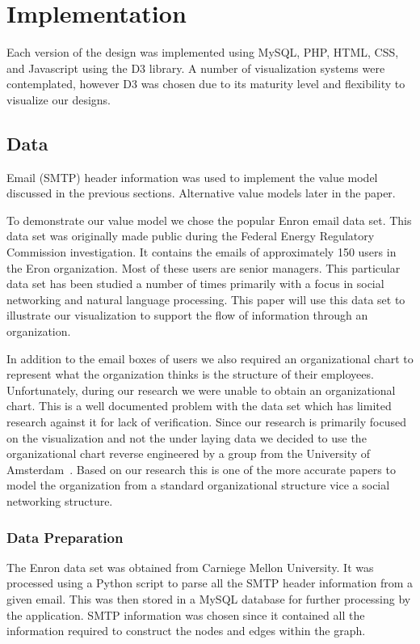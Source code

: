 \documentclass[journal]{vgtc}                %
\begin{document}
\section{Implementation}
\label{sec:implementation}
Each version of the design was implemented using MySQL, PHP, HTML, CSS, and Javascript using the D3 library.  A number of visualization systems were contemplated, however D3 was chosen due to its maturity level and flexibility to visualize our designs.

\subsection{Data}
Email (SMTP) header information was used to implement the value model discussed in the previous sections.  Alternative value models later in the paper.

To demonstrate our value model we chose the popular Enron email data set.  This data set was originally made public during the Federal Energy Regulatory Commission investigation.  It contains the emails of approximately 150 users in the Eron organization.  Most of these users are senior managers.  This particular data set has been studied a number of times primarily with a focus in social networking and natural language processing.  This paper will use this data set to illustrate our visualization to support the flow of information through an organization.  

In addition to the email boxes of users we also required an organizational chart to represent what the organization thinks is the structure of their employees.  Unfortunately, during our research we were unable to obtain an organizational chart.  This is a well documented problem with the data set which has limited research against it for lack of verification.  Since our research is primarily focused on the visualization and not the under laying data we decided to use the organizational chart reverse engineered by a group from the University of Amsterdam~\cite{rowe2007automated}.  Based on our research this is one of the more accurate papers to model the organization from a standard organizational structure vice a social networking structure.

\subsubsection{Data Preparation}

The Enron data set was obtained from Carniege Mellon University.  It was processed using a Python script to parse all the SMTP header information from a given email.  This was then stored in a MySQL database for further processing by the application.  SMTP information was chosen since it contained all the information required to construct the nodes and edges within the graph.  
\end{document}
